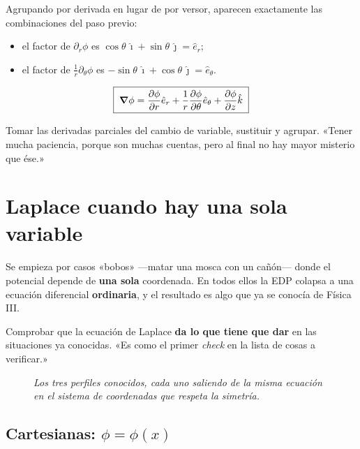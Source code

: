 \documentclass[12pt,a4paper]{article}
\begin{document}
Agrupando por derivada en lugar de por versor, aparecen exactamente las
combinaciones del paso previo:

\begin{itemize}[nosep]
  \item el factor de $\partial_r\phi$ es
        $\cos\theta\,\hat\imath + \sin\theta\,\hat\jmath = \hat e_r$;
  \item el factor de $\tfrac{1}{r}\partial_\theta\phi$ es
        $-\sin\theta\,\hat\imath + \cos\theta\,\hat\jmath = \hat e_\theta$.
\end{itemize}

\[
\boxed{\;\grad\phi = \pdv{\phi}{r}\hat e_r + \frac{1}{r}\pdv{\phi}{\theta}\hat e_\theta
+ \pdv{\phi}{z}\hat k\;}
\]

\begin{notebox}
Tomar las derivadas parciales del cambio de variable, sustituir y agrupar. «Tener
mucha paciencia, porque son muchas cuentas, pero al final no hay mayor misterio
que ése.»
\end{notebox}

\section{Laplace cuando hay una sola variable}

Se empieza por casos «bobos» ---matar una mosca con un cañón--- donde el potencial
depende de \textbf{una sola} coordenada. En todos ellos la EDP colapsa a una
ecuación diferencial \textbf{ordinaria}, y el resultado es algo que ya se conocía
de Física III.

\begin{notebox}
Comprobar que la ecuación de Laplace \textbf{da lo que tiene que dar} en las
situaciones ya conocidas. «Es como el primer \emph{check} en la lista de cosas a
verificar.»
\end{notebox}

\begin{figure}[H]
  \centering
  
  \caption*{\small\itshape Los tres perfiles conocidos, cada uno saliendo de la
  misma ecuación en el sistema de coordenadas que respeta la simetría.}
\end{figure}

\subsection{Cartesianas: \texorpdfstring{$\phi = \phi(x)$}{phi = phi(x)}}
\end{document}
